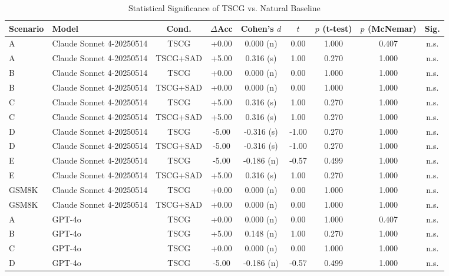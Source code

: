 \begin{table}[htbp]
  \centering
  \caption{Statistical Significance of TSCG vs. Natural Baseline}
  \label{tab:significance}
  \small
  \begin{tabular}{llccccccc}
    \toprule
    Scenario & Model & Cond. & $\Delta$Acc & Cohen's $d$ & $t$ & $p$ (t-test) & $p$ (McNemar) & Sig. \\
    \midrule
    A & Claude Sonnet 4-20250514 & TSCG & +0.00 & 0.000 (n) & 0.00 & 1.000 & 0.407 & n.s. \\
    A & Claude Sonnet 4-20250514 & TSCG+SAD & +5.00 & 0.316 (s) & 1.00 & 0.270 & 1.000 & n.s. \\
    \addlinespace
    B & Claude Sonnet 4-20250514 & TSCG & +0.00 & 0.000 (n) & 0.00 & 1.000 & 1.000 & n.s. \\
    B & Claude Sonnet 4-20250514 & TSCG+SAD & +0.00 & 0.000 (n) & 0.00 & 1.000 & 1.000 & n.s. \\
    \addlinespace
    C & Claude Sonnet 4-20250514 & TSCG & +5.00 & 0.316 (s) & 1.00 & 0.270 & 1.000 & n.s. \\
    C & Claude Sonnet 4-20250514 & TSCG+SAD & +5.00 & 0.316 (s) & 1.00 & 0.270 & 1.000 & n.s. \\
    \addlinespace
    D & Claude Sonnet 4-20250514 & TSCG & -5.00 & -0.316 (s) & -1.00 & 0.270 & 1.000 & n.s. \\
    D & Claude Sonnet 4-20250514 & TSCG+SAD & -5.00 & -0.316 (s) & -1.00 & 0.270 & 1.000 & n.s. \\
    \addlinespace
    E & Claude Sonnet 4-20250514 & TSCG & -5.00 & -0.186 (n) & -0.57 & 0.499 & 1.000 & n.s. \\
    E & Claude Sonnet 4-20250514 & TSCG+SAD & +5.00 & 0.316 (s) & 1.00 & 0.270 & 1.000 & n.s. \\
    \addlinespace
    GSM8K & Claude Sonnet 4-20250514 & TSCG & +0.00 & 0.000 (n) & 0.00 & 1.000 & 1.000 & n.s. \\
    GSM8K & Claude Sonnet 4-20250514 & TSCG+SAD & +0.00 & 0.000 (n) & 0.00 & 1.000 & 1.000 & n.s. \\
    \addlinespace
    A & GPT-4o & TSCG & +0.00 & 0.000 (n) & 0.00 & 1.000 & 0.407 & n.s. \\
    \addlinespace
    B & GPT-4o & TSCG & +5.00 & 0.148 (n) & 1.00 & 0.270 & 1.000 & n.s. \\
    \addlinespace
    C & GPT-4o & TSCG & +0.00 & 0.000 (n) & 0.00 & 1.000 & 1.000 & n.s. \\
    \addlinespace
    D & GPT-4o & TSCG & -5.00 & -0.186 (n) & -0.57 & 0.499 & 1.000 & n.s. \\

\end{tabular}
\end{table}
